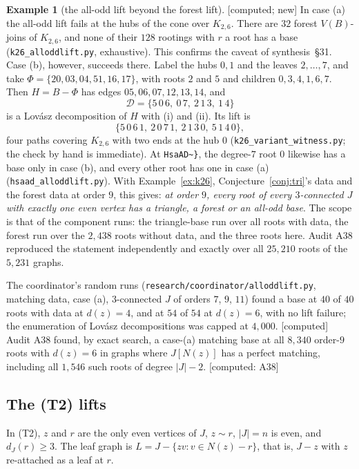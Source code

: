 \documentclass[11pt]{amsart}
\theoremstyle{definition}
\newtheorem{example}[theorem]{Example}
\newcommand{\st}[1]{\textsf{\small[#1]}}
\newcommand{\cD}{\mathcal D}
\begin{document}
\begin{example}[the all-odd lift beyond the forest lift]\label{ex:allodd} \st{computed; new}
In case (a) the all-odd lift fails at the hubs of the cone over $K_{2,6}$. There are $32$ forest
$V(B)$-joins of $K_{2,6}$, and none of their $128$ rootings with $r$ a root has a base
(\texttt{k26\_alloddlift.py}, exhaustive). This confirms the caveat of synthesis~\S31. Case (b),
however, succeeds there. Label the hubs $0,1$ and the leaves $2,\dots,7$, and take
$\Phi=\{20,03,04,51,16,17\}$, with roots $2$ and $5$ and children $0,3,4,1,6,7$. Then $H=B-\Phi$ has
edges $05,06,07,12,13,14$, and
\[
\cD=\{5\,0\,6,\ 0\,7,\ 2\,1\,3,\ 1\,4\}
\]
is a Lov\'asz decomposition of $H$ with (i) and (ii). Its lift is
\[
\{5\,0\,6\,1,\ 2\,0\,7\,1,\ 2\,1\,3\,0,\ 5\,1\,4\,0\},
\]
four paths covering $K_{2,6}$ with two ends at the hub $0$ (\texttt{k26\_variant\_witness.py}; the check
by hand is immediate). At \texttt{HsaAD\textasciitilde\}}, the degree-$7$ root $0$ likewise has a base
only in case (b), and every other root has one in case (a) (\texttt{hsaad\_alloddlift.py}). With
Example~\ref{ex:k26}, Conjecture~\ref{conj:tri}'s data and the forest data at order $9$, this gives:
\emph{at order $9$, every root of every $3$-connected $J$ with exactly one even vertex has a triangle, a
forest or an all-odd base}. The scope is that of the component runs: the triangle-base run over
all roots with data, the forest run over the $2{,}438$ roots without data, and the three roots here.
Audit A38 reproduced the statement independently and exactly over all $25{,}210$ roots of the
$5{,}231$ graphs.
\end{example}

The coordinator's random runs (\texttt{research/coordinator/alloddlift.py}, matching data, case (a),
$3$-connected $J$ of orders $7$, $9$, $11$) found a base at $40$ of $40$ roots with data at $d(z)=4$,
and at $54$ of $54$ at $d(z)=6$, with no lift failure; the enumeration of Lov\'asz decompositions was
capped at $4{,}000$. \st{computed} Audit A38 found, by exact search, a case-(a) matching base at all
$8{,}340$ order-$9$ roots with $d(z)=6$ in graphs where $J[N(z)]$ has a perfect matching, including
all $1{,}546$ such roots of degree $|J|-2$. \st{computed: A38}

\subsection{The (T2) lifts}\label{sec:t2}

In (T2), $z$ and $r$ are the only even vertices of $J$, $z\sim r$, $|J|=n$ is even, and $d_J(r)\ge3$.
The leaf graph is $L=J-\{zv:v\in N(z)-r\}$, that is, $J-z$ with $z$ re-attached as a leaf at $r$.
\end{document}
